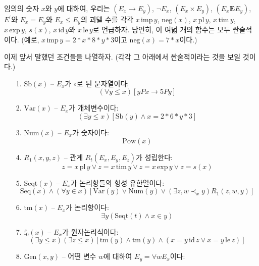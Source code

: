 \documentclass[12pt]{paper}
\begin{document}
임의의 숫자 $x$와 $y$에 대하여, 우리는 $\left( E_{x} \rightarrow E_{y} \right)$, $\lnot E_{x}$, $\left( E_{x} \times E_{y} \right)$, $\left( E_{x} \mathrm{\mathbf{E}} E_{y} \right)$, $E^{\prime}$와 $E_{x} = E_{y}$와 $E_{x} \le E_{y}$의 괴델 수를
각각 $x \, \mathrm{imp} \, y$, $\mathrm{neg} \left( x \right)$, $x \, \mathrm{pl} \, y$, $x \, \mathrm{tim} \, y$, $x \, \mathrm{exp} \, y$, $s \left( x \right)$, $x \, \mathrm{id} \, y$와 $x \, \mathrm{le} \, y$로 언급하자.
당연히, 이 여덟 개의 함수는 모두 싼술적이다. (예로, $x \, \mathrm{imp} \, y = 2 * x * 8 * y * 3$이고 $\mathrm{neg} \left( x \right) = 7 * x$이다.)

이제 앞서 말했던 조건들을 나열하자. (각각 그 아래에서 싼술적이라는 것을 보일 것이다.)
\begin{enumerate}
\item[{1.}] $\mathrm{Sb} \left( x \right)$ -- $E_x$가 $\circ$로 된 문자열이다:
$$ \left( \forall y \le x \right) \left[ y P x \rightarrow 5 P y \right] $$
\item[{2.}] $\mathrm{Var} \left( x \right)$ -- $E_x$가 개체변수이다:
$$ \left( \exists y \le x \right) \left[ \mathrm{Sb} \left( y \right) \land x = 2 * 6 * y * 3 \right] $$
\item[{3.}] $\mathrm{Num} \left( x \right)$ -- $E_x$가 숫자이다:
$$ \mathrm{Pow}\left( x \right) $$
\item[{4.}] $R_1 \left( x , y , z \right)$ -- 관계 $R_t \left( E_x , E_y , E_z \right)$가 성립한다:
$$ z = x \, \mathrm{pl} \, y \lor z = x \, \mathrm{tim} \, y \lor z = x \, \mathrm{exp} \, y \lor z = s \left( x \right) $$
\item[{5.}] $\mathrm{Seqt} \left( x \right)$ -- $E_{x}$가 논리항들의 형성 유한열이다:
$$ \mathrm{Seq} \left( x \right) \land \left( \forall y \in x \right) \left[ \mathrm{Var} \left( y \right) \lor \mathrm{Num} \left( y \right) \lor \left( \exists z , w \prec_x y \right) R_1 \left( z , w , y \right) \right] $$
\item[{6.}] $\mathrm{tm} \left( x \right)$ -- $E_{x}$가 논리항이다:
$$ \exists y \left( \mathrm{Seqt} \left( t \right) \land x \in y \right) $$
\item[{7.}] $\mathrm{f}_0 \left( x \right)$ -- $E_{x}$가 원자논리식이다:
$$ \left( \exists y \le x \right) \left( \exists z \le x \right) \left[ \mathrm{tm}\left( y \right) \land \mathrm{tm}\left( y \right) \land \left( x = y \, \mathrm{id} \, z \lor x = y \, \mathrm {le} \, z \right) \right] $$
\item[{8.}] $\mathrm{Gen} \left( x , y \right)$ -- 어떤 변수 $w$에 대하여 $E_y = \forall w E_x $이다:

\end{enumerate}
\end{document}
